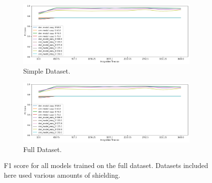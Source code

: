 \begin{figure}[H]
     \centering
     \begin{subfigure}[b]{0.9\textwidth}
         \centering
         \includegraphics[width=\textwidth]{images/results_easy_distance_comparison}
         \caption{Simple Dataset.}
         \label{fig:results_full_background_inject_simple}
     \end{subfigure}

     \begin{subfigure}[b]{0.9\textwidth}
         \centering
         \includegraphics[width=\textwidth]{images/results_easy_distance_comparison}
         \caption{Full Dataset.}
         \label{fig:results_full_background_inject_full}
     \end{subfigure}
        \caption{F1 score for all models trained on the full dataset. Datasets included here used various amounts of shielding.}
        \label{fig:results_full_background_inject}
\end{figure}





